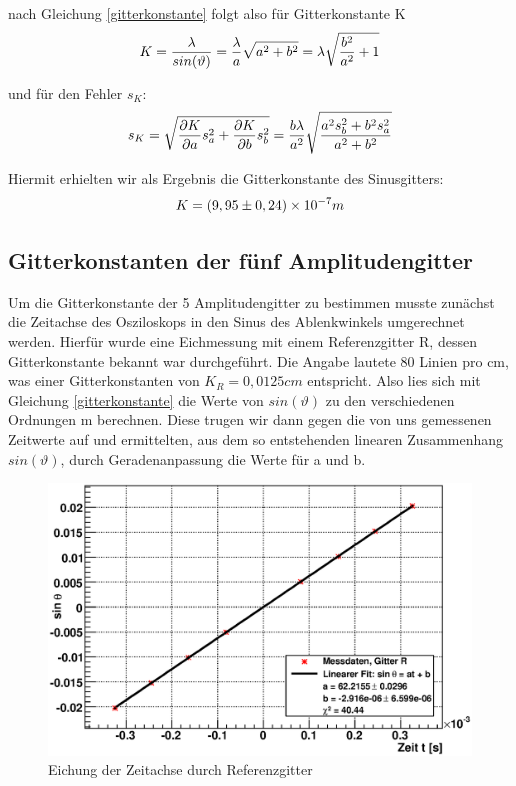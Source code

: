 \documentclass[12pt]{article}
\begin{document}
nach Gleichung \ref{gitterkonstante} folgt also für Gitterkonstante K
\begin{align}
\notag
 K=\frac{\lambda}{sin(\vartheta)}=\frac{\lambda}{a}\sqrt{a^2+b^2}= \lambda\sqrt{\frac{b^2}{a^2}+1}
\end{align}

und für den Fehler $s_K$:
\begin{align}
\notag
 s_K=\sqrt{\frac{\partial K}{\partial a}s_a^2+\frac{\partial K}{\partial b}s_b^2}=\frac{b\lambda}{a^2}\sqrt{\frac{a^2s_b^2+b^2s_a^2}{a^2+b^2}}
\end{align}

Hiermit erhielten wir als Ergebnis die Gitterkonstante des Sinusgitters:
\begin{align}
\notag
 K=(9,95\pm0,24)\times10^{-7}m
\end{align}
\subsection{Gitterkonstanten der fünf Amplitudengitter}
Um die Gitterkonstante der 5 Amplitudengitter zu bestimmen musste zunächst die Zeitachse des Osziloskops in den Sinus des Ablenkwinkels umgerechnet werden. Hierfür wurde eine Eichmessung mit einem Referenzgitter R, dessen Gitterkonstante bekannt war durchgeführt. Die Angabe lautete 80 Linien pro cm, was einer Gitterkonstanten von $K_R=0,0125cm$ entspricht. Also lies sich mit Gleichung \ref{gitterkonstante} die Werte von $sin(\vartheta)$ zu den verschiedenen Ordnungen m berechnen. Diese trugen wir dann gegen die von uns gemessenen Zeitwerte auf und ermittelten, aus dem so entstehenden linearen Zusammenhang $sin(\vartheta)$, durch Geradenanpassung die Werte für a und b.

\begin{figure}[H]  
\centering
\includegraphics[width=0.7\linewidth]{pictures/r.eps}
\caption{Eichung der Zeitachse durch Referenzgitter}
\end{figure}
\end{document}

